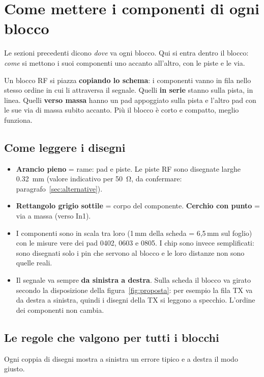 \documentclass[a4paper,11pt]{article}
\begin{document}
\section{Come mettere i componenti di ogni blocco}
\label{sec:blocchi-come}
Le sezioni precedenti dicono \emph{dove} va ogni blocco. Qui si entra dentro il blocco: \emph{come} si mettono i suoi componenti uno accanto all'altro, con le piste e le via.

\begin{semplice}
Un blocco RF si piazza \textbf{copiando lo schema}: i componenti vanno in fila nello stesso ordine in cui li attraversa il segnale. Quelli \textbf{in serie} stanno sulla pista, in linea. Quelli \textbf{verso massa} hanno un pad appoggiato sulla pista e l'altro pad con le sue via di massa subito accanto. Più il blocco è corto e compatto, meglio funziona.
\end{semplice}

\subsection{Come leggere i disegni}
\begin{itemize}
\item \textbf{Arancio pieno} = rame: pad e piste. Le piste RF sono disegnate larghe \SI{0.32}{mm} (valore indicativo per \SI{50}{\ohm}, da confermare: paragrafo~\ref{sec:alternative}).
\item \textbf{Rettangolo grigio sottile} = corpo del componente. \textbf{Cerchio con punto} = via a massa (verso In1).
\item I componenti sono in scala tra loro (1\,mm della scheda = 6,5\,mm sul foglio) con le misure vere dei pad 0402, 0603 e 0805. I chip sono invece semplificati: sono disegnati solo i pin che servono al blocco e le loro distanze non sono quelle reali.
\item Il segnale va sempre \textbf{da sinistra a destra}. Sulla scheda il blocco va girato secondo la disposizione della figura~\ref{fig:proposta}: per esempio la fila TX va da destra a sinistra, quindi i disegni della TX si leggono a specchio. L'ordine dei componenti non cambia.
\end{itemize}

\subsection{Le regole che valgono per tutti i blocchi}
Ogni coppia di disegni mostra a sinistra un errore tipico e a destra il modo giusto.
\end{document}
